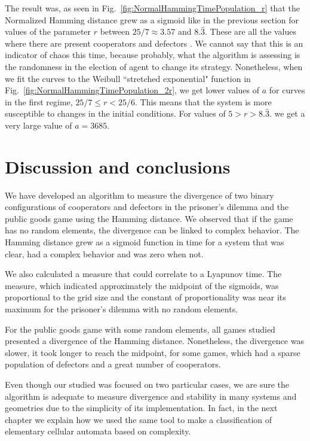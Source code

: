 The result was, as seen in Fig.~\ref{fig:NormalHammingTimePopulation_r} that the Normalized Hamming distance grew as a sigmoid like in the previous section for values of the parameter $r$ between $25/7\approx3.57$ and $8.\hat3$. These are all the values where there are present cooperators and defectors . We cannot say that this is an indicator of chaos this time, because probably, what the algorithm is assessing is the randomness in the election of agent to change its strategy. Nonetheless, when we fit the curves to the Weibull ``stretched exponential" function in Fig.~\ref{fig:NormalHammingTimePopulation_2r}, we get lower values of $a$ for curves in the first regime, $25/7\leq r<25/6$. This means that the system is more susceptible to changes in the initial conditions. For values of $5>r>8.\hat3.$ we get a very large value of $a = 3685$.


\section{Discussion and conclusions}

We have developed an algorithm to measure the divergence of two binary configurations of cooperators and defectors in the prisoner's dilemma and the public goods game using the Hamming distance. We observed that if the game has no random elements, the divergence can be linked to complex behavior.
The Hamming distance grew as a sigmoid function in time for a system that was clear, had a complex behavior and was zero when not.
 
We also calculated a measure that could correlate to a Lyapunov time. The measure, which indicated approximately the midpoint of the sigmoids, was proportional to the grid size and the constant of proportionality was near its maximum for the prisoner's dilemma with no random elements.

For the public goods game with some random elements, all games studied presented a divergence of the Hamming distance. Nonetheless, the divergence was slower, it took longer to reach the midpoint, for some games, which had a sparse population of defectors and a great number of cooperators.

Even though our studied was focused on two particular cases, we are sure the algorithm is adequate to measure divergence and stability in many systems and geometries due to the simplicity of its implementation. In fact, in the next chapter we explain how we used the same tool to make a classification of elementary cellular automata based on complexity.

